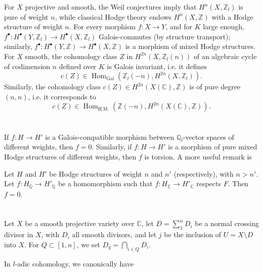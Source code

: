   For \(X\) projective and smooth, the Weil conjectures imply that \(H^n(X,\mathbb {Z}_l)\) is pure of weight \(n\), while classical Hodge theory endows \(H^n(X,\mathbb {Z})\) with a Hodge structure of weight \(n\).
  For every morphism \(f\colon  X\to  Y\), and for \(K\) large enough, \(f^\bullet \colon  H^\bullet (Y,\mathbb {Z}_l)\to  H^\bullet (X,\mathbb {Z}_l)\) Galois-commutes (by structure transport);
  similarly, \(f^\bullet \colon  H^\bullet (Y,\mathbb {Z})\to  H^\bullet (X,\mathbb {Z})\) is a morphism of mixed Hodge structures.
  For \(X\) smooth, the cohomology class \(Z\) in \(H^{2n}(X,\mathbb {Z}_l(n))\) of an algebraic cycle of codimension \(n\) defined over \(K\) is Galois invariant, i.e. it defines
  \[     c(Z) \in  \operatorname {Hom}_{\operatorname {Gal}}(\mathbb {Z}_l(-n),H^{2n}(X,\mathbb {Z}_l)).   \]
  Similarly, the cohomology class \(c(Z)\in  H^{2n}(X(\mathbb {C}),\mathbb {Z})\) is of pure degree \((n,n)\), i.e. it corresponds to
  \[     c(Z) \in  \operatorname {Hom}_{\mathrm {H.M.}}(\mathbb {Z}(-n),H^{2n}(X(\mathbb {C}),\mathbb {Z})).   \]\chapter{}\thispagestyle{fancy}\label{hodge-theory-i-5}\par{}If \(f\colon  H\to  H'\) is a Galois-compatible morphism between \(\mathbb {Q}_l\)-vector spaces of different weights, then \(f=0\).
  Similarly, if \(f\colon  H\to  H'\) is a morphism of pure mixed Hodge structures of different weights, then \(f\) is torsion.
  A more useful remark is\begin{scholium}{}\label{hodge-theory-i-5-scholium}\skipsinglepar\par{}Let \(H\) and \(H'\) be Hodge structures of weight \(n\) and \(n'\) (respectively), with \(n>n'\).
    Let \(f\colon  H_\mathbb {Q}\to  H'_\mathbb {Q}\) be a homomorphism such that \(f\colon  H_\mathbb {C}\to  H'_\mathbb {C}\) respects \(F\).
    Then \(f=0\).\end{scholium}\chapter{}\thispagestyle{fancy}\label{hodge-theory-i-6}\par{}Let \(X\) be a smooth projective variety over \(\mathbb {C}\), let \(D=\sum _1^n D_i\) be a normal crossing divisor in \(X\), with \(D_i\) all smooth divisors, and let \(j\) be the inclusion of \(U=X\setminus  D\) into \(X\).
  For \(Q\subset [1,n]\), we set \(D_q=\bigcap _{i\in  Q}D_i\).\par{}In \(l\)-adic cohomology, we canonically have

